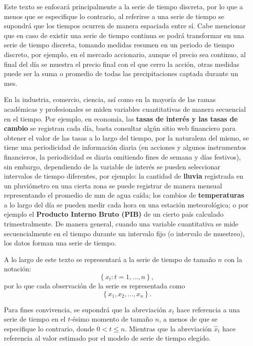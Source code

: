 \documentclass[
  spanish,
]{book}
\theoremstyle{remark}
\begin{document}
Este texto se enfocará principalmente a la serie de tiempo discreta, por lo que a menos que se especifique lo contrario, al referirse a una serie de tiempo se supondrá que los tiempos ocurren de manera espaciada entre sí. Cabe mencionar que en caso de existir una serie de tiempo continua se podrá transformar en una serie de tiempo discreta, tomando medidas resumen en un periodo de tiempo discreto, por ejemplo, en el mercado accionario, aunque el precio sea continuo, al final del día se muestra el precio final con el que cerro la acción, otras medidas puede ser la suma o promedio de todas las precipitaciones captada durante un mes.

En la industria, comercio, ciencia, así como en la mayoría de las ramas académicas y profesionales se miden variables cuantitativas de manera secuencial en el tiempo. Por ejemplo, en economía, las \textbf{tasas de interés y las tasas de cambio} se registran cada día, basta consultar algún sitio web financiero para obtener el valor de las tasas a lo largo del tiempo, por la naturaleza del mismo, se tiene una periodicidad de información diaria (en acciones y algunos instrumentos financieros, la periodicidad es diaria omitiendo fines de semana y días festivos), sin embargo, dependiendo de la variable de interés se pueden seleccionar intervalos de tiempo diferentes, por ejemplo: la cantidad de \textbf{lluvia} registrada en un pluviómetro en una cierta zona se puede registrar de manera mensual representando el promedio de mm de agua caída; los cambios de \textbf{temperaturas} a lo largo del día se pueden medir cada hora en una estación meteorológica; o por ejemplo el \textbf{Producto Interno Bruto (PIB) } de un cierto país calculado trimestralmente. De manera general, cuando una variable cuantitativa se mide secuencialmente en el tiempo durante un intervalo fijo (o intervalo de muestreo), los datos forman una serie de tiempo.

A lo largo de este texto se representará a la serie de tiempo de tamaño \(n\) con la notación: \[\left\{x_t : t=1,\ldots, n\right\},\] por lo que cada observación de la serie es representada como
\[\left\{x_1,x_2, \ldots, x_n\right\}.\]

Para fines convivencia, se supondrá que la abreviación \(x_t\) hace referencia a una serie de tiempo en el \(t\)-ésimo momento de tamaño \(n\), a menos de que se especifique lo contrario, donde \(0< t \le n\). Mientras que la abreviación \(\hat{x}_t\) hace referencia al valor estimado por el modelo de serie de tiempo elegido.
\end{document}

